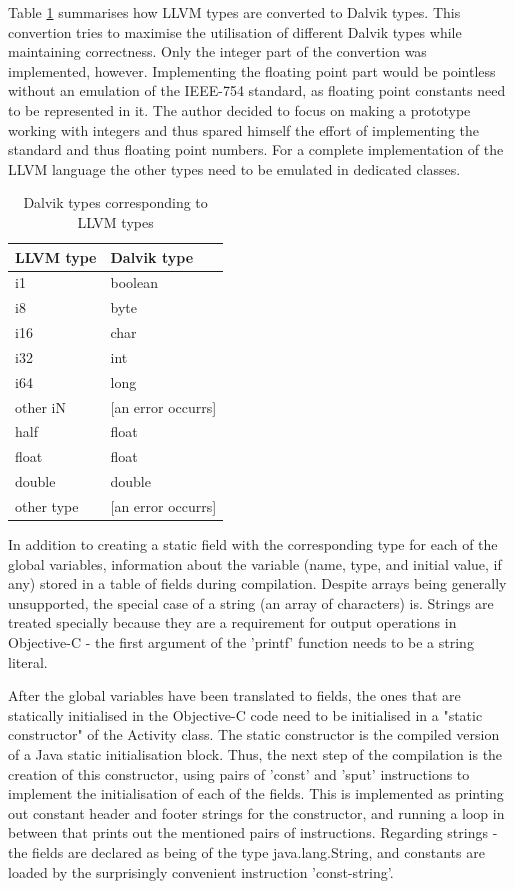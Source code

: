 \documentclass[parskip]{cs4rep}
\begin{document}
Table \ref{tab:typeConvertion} summarises how LLVM types are converted to Dalvik types. This convertion tries to maximise the utilisation of different Dalvik types while maintaining correctness. Only the integer part of the convertion was implemented, however. Implementing the floating point part would be pointless without an emulation of the IEEE-754 standard, as floating point constants need to be represented in it. The author decided to focus on making a prototype working with integers and thus spared himself the effort of implementing the standard and thus floating point numbers. For a complete implementation of the LLVM language the other types need to be emulated in dedicated classes.

\begin{table}[htb]
    \centering
    \begin{tabular}{ | l | l |}
    \hline
    LLVM type & Dalvik type \\ \hline \hline
    i1 & boolean \\ \hline
    i8 & byte \\ \hline
    i16 & char \\ \hline
    i32 & int \\ \hline
    i64 & long \\ \hline
    other iN & [an error occurrs] \\ \hline
    half & float \\ \hline
    float & float \\ \hline
    double & double \\ \hline
    other type & [an error occurrs] \\ \hline
    \end{tabular}
    \caption{Dalvik types corresponding to LLVM types}
    \label{tab:typeConvertion}
\end{table}

In addition to creating a static field with the corresponding type for each of the global variables, information about the variable (name, type, and initial value, if any) stored in a table of fields during compilation. Despite arrays being generally unsupported, the special case of a string (an array of characters) is. Strings are treated specially because they are a requirement for output operations in Objective-C - the first argument of the 'printf' function needs to be a string literal.

After the global variables have been translated to fields, the ones that are statically initialised in the Objective-C code need to be initialised in a "static constructor" of the Activity class. The static constructor is the compiled version of a Java static initialisation block. Thus, the next step of the compilation is the creation of this constructor, using pairs of 'const' and 'sput' instructions to implement the initialisation of each of the fields. This is implemented as printing out constant header and footer strings for the constructor, and running a loop in between that prints out the mentioned pairs of instructions. Regarding strings - the fields are declared as being of the type java.lang.String, and constants are loaded by the surprisingly convenient instruction 'const-string'.
\end{document}
